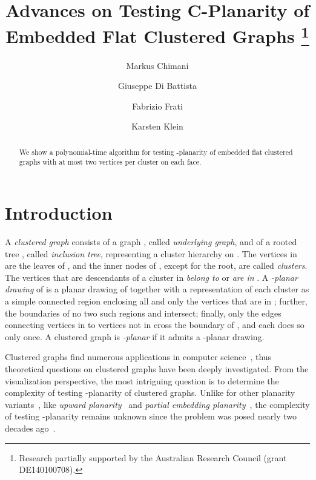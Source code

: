 \documentclass[letter,runningheads]{llncs}
\begin{document}
\title{Advances on Testing C-Planarity of\\ Embedded Flat Clustered Graphs
\thanks{Research partially supported by the Australian Research Council (grant DE140100708).}
}
\author{Markus Chimani \and Giuseppe Di Battista \and Fabrizio Frati \and Karsten Klein}
\maketitle

\begin{abstract}
We show a polynomial-time algorithm for testing -planarity of embedded flat clustered graphs with at most two vertices per cluster on each face.
\end{abstract}


\section{Introduction}
A \emph{clustered graph}  consists of a graph , called {\em underlying graph}, and of a rooted tree , called {\em inclusion tree}, representing a cluster hierarchy on . The vertices in  are the leaves of , and the inner nodes of , except for the root, are called \emph{clusters}. The vertices that are descendants of a cluster  in  {\em belong to}  or {\em are in} . A \emph{-planar drawing} of  is a planar drawing of  together with a representation of each cluster   as a simple connected region  enclosing all and only the vertices that are in ; further, the boundaries of no two such regions  and  intersect; finally, only the edges connecting vertices in  to vertices not in  cross the boundary of , and each does so only once. A clustered graph is \emph{-planar} if it admits a -planar drawing.

Clustered graphs find numerous applications in computer science~\cite{s-gc-07}, thus theoretical questions on clustered graphs have been deeply investigated. From the visualization perspective, the most intriguing question is to determine the complexity of testing -planarity of clustered graphs. Unlike for other planarity variants~\cite{s-ttphtpv-13}, like {\em upward planarity}~\cite{GT01} and {\em partial embedding planarity}~\cite{adfjkpr-tppeg-10}, the complexity of testing -planarity remains unknown since the problem was posed nearly two decades ago~\cite{fce-pcg-95}.
\end{document}
